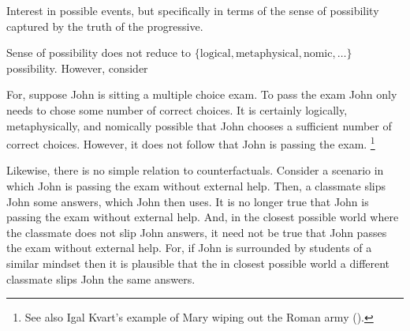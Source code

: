 \begin{note}
  Interest in possible events, but specifically in terms of the sense of possibility captured by the truth of the progressive.

  Sense of possibility does not reduce to \(\{\text{logical}, \text{metaphysical}, \text{nomic}, \dots\}\) possibility.
  However, consider

  For, suppose John is sitting a multiple choice exam.
  To pass the exam John only needs to chose some number of correct choices.
  It is certainly logically, metaphysically, and nomically possible that John chooses a sufficient number of correct choices.
  However, it does not follow that John is passing the exam.%
  \footnote{
    See also Igal Kvart's example of Mary wiping out the Roman army (\cite[18]{Landman:1992wh}).
  }

  Likewise, there is no simple relation to counterfactuals.
  Consider a scenario in which John is passing the exam without external help.
  Then, a classmate slips John some answers, which John then uses.
  It is no longer true that John is passing the exam without external help.
  And, in the closest possible world where the classmate does not slip John answers, it need not be true that John passes the exam without external help.
  For, if John is surrounded by students of a similar mindset then it is plausible that the in closest possible world a different classmate slips John the same answers.
\end{note}

